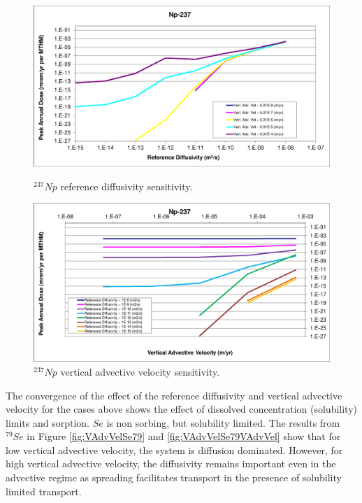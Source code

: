 \begin{figure}[htp!]
\begin{minipage}[b]{0.45\linewidth}
\includegraphics[width=\linewidth]{./chapters/nuclide_sensitivity/clay/AdvVelAndDiffCoeffEBSFail/Np-237.eps}
\caption{$^{237}Np$ reference diffusivity sensitivity.}
\label{fig:VAdvVelNp237}

\end{minipage}
\hspace{0.05\linewidth}
\begin{minipage}[b]{0.45\linewidth}

\includegraphics[width=\linewidth]{./chapters/nuclide_sensitivity/clay/AdvVelAndDiffCoeffEBSFail/Np-237-VAdvVel.eps}
\caption{$^{237}Np$ vertical advective velocity sensitivity.}
\label{fig:VAdvVelNp237VAdvVel}
  
\end{minipage}
\end{figure}

The convergence of the effect of the reference diffusivity and vertical 
advective velocity for the cases above shows the effect of dissolved 
concentration (solubility) limits and sorption. $Se$ is non sorbing, but 
solubility limited.  The results from $^{79}Se$ in Figure \ref{fig:VAdvVelSe79} 
and \ref{fig:VAdvVelSe79VAdvVel} show that for low vertical advective velocity, 
the system is diffusion dominated.  However, for high vertical advective 
velocity, the diffusivity remains important even in the advective regime as 
spreading facilitates transport in the presence of solubility limited transport. 

